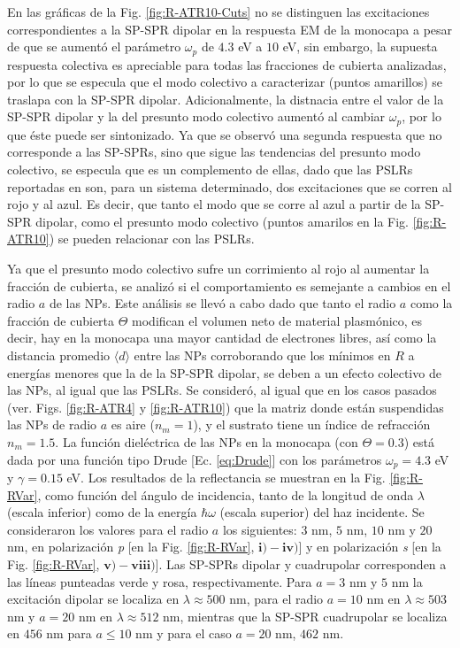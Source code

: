 En las gráficas de la Fig. \ref{fig:R-ATR10-Cuts} no se distinguen las excitaciones correspondientes a la SP-SPR dipolar en la respuesta EM de la monocapa a pesar de que se aumentó el parámetro $\omega_p$ de $4.3$ eV a $10$ eV, sin embargo, la supuesta respuesta colectiva es apreciable para todas las fracciones de cubierta analizadas, por lo que se especula que el modo colectivo a caracterizar (puntos amarillos) se traslapa con la SP-SPR  dipolar. Adicionalmente, la distnacia entre el valor de la SP-SPR dipolar y la del presunto modo colectivo aumentó al cambiar $\omega_p$, por lo que éste puede ser sintonizado. Ya que se observó una segunda respuesta que no corresponde a las SP-SPRs, sino que sigue las tendencias del presunto modo colectivo, se especula que es un complemento  de ellas, dado que las  PSLRs reportadas en \cite{danilov2018ultra} son, para un sistema determinado, dos excitaciones que se corren al rojo y al azul. Es decir, que tanto el modo que se corre al azul a partir de la SP-SPR dipolar, como el presunto modo colectivo (puntos amarilos en la Fig. \ref{fig:R-ATR10}) se pueden relacionar con las PSLRs.  

 Ya que el presunto modo colectivo sufre un corrimiento al rojo al aumentar la fracción de cubierta, se analizó si el comportamiento es semejante a cambios en el radio $a$ de las NPs.  Este análisis se llevó a cabo dado que tanto el radio $a$ como la fracción de cubierta $\Theta$ modifican el volumen neto de material plasmónico, es decir, hay en la monocapa una mayor cantidad de electrones libres, así como la distancia promedio $\langle d  \rangle$ entre las NPs  corroborando que los mínimos en $R$  a energías menores que la de la SP-SPR dipolar, se deben a un efecto colectivo de las NPs, al igual que las PSLRs. Se consideró, al igual que en los casos pasados (ver. Figs. \ref{fig:R-ATR4} y  \ref{fig:R-ATR10}) que la matriz donde están suspendidas las NPs de radio $a$ es aire ($n_m = 1$), y el sustrato tiene un índice de refracción $n_m= 1.5$. La función dieléctrica de las NPs en la monocapa (con $\Theta=0.3$) está dada por una función tipo Drude [Ec. \eqref{eq:Drude}] con los parámetros $\omega_p =4.3$ eV y $\gamma=0.15$ eV. Los resultados de la reflectancia se muestran en la Fig.  \ref{fig:R-RVar}, como función del ángulo de incidencia, tanto de la longitud de onda $\lambda$ (escala inferior) como de la  energía $\hbar\omega$ (escala superior) del haz incidente. Se consideraron los valores para el radio $a$ los siguientes: $3$ nm, $5$ nm, $10$ nm y $20$ nm,  en polarización \emph{p} [en la Fig.  \ref{fig:R-RVar}, $\mathbf{i)-iv)}$] y en polarización \emph{s} [en la Fig.  \ref{fig:R-RVar}, $\mathbf{v)-viii)}$].  Las SP-SPRs dipolar y cuadrupolar corresponden a las líneas punteadas verde y rosa, respectivamente. Para $a = 3$ nm y $5$ nm la excitación dipolar se localiza en $\lambda\approx 500$ nm, para el radio  $a = 10$ nm en $\lambda\approx 503$ nm y $a=20$ nm en $\lambda\approx 512$ nm, mientras que la SP-SPR cuadrupolar se localiza en $456$ nm para $a\leq 10$ nm y para el caso  $a=20$ nm, $462$ nm.

